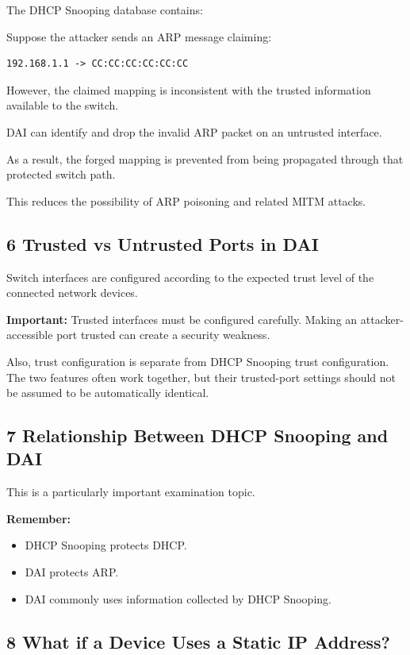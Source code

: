 The DHCP Snooping database contains:


Suppose the attacker sends an ARP message claiming:

\begin{lstlisting}
192.168.1.1 -> CC:CC:CC:CC:CC:CC
\end{lstlisting}

However, the claimed mapping is inconsistent with the trusted information available to the switch.

DAI can identify and drop the invalid ARP packet on an untrusted interface.

As a result, the forged mapping is prevented from being propagated through that protected switch path.

This reduces the possibility of ARP poisoning and related MITM attacks.

\subsection{6 Trusted vs Untrusted Ports in DAI}

Switch interfaces are configured according to the expected trust level of the connected network devices.


\textbf{Important:} Trusted interfaces must be configured carefully. Making an attacker-accessible port trusted can create a security weakness.

Also, trust configuration is separate from DHCP Snooping trust configuration. The two features often work together, but their trusted-port settings should not be assumed to be automatically identical.

\subsection{7 Relationship Between DHCP Snooping and DAI}

This is a particularly important examination topic.


\textbf{Remember:}

\begin{itemize}
\item DHCP Snooping protects DHCP.
\item DAI protects ARP.
\item DAI commonly uses information collected by DHCP Snooping.
\end{itemize}

\subsection{8 What if a Device Uses a Static IP Address?}

